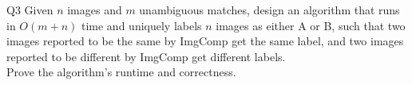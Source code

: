 \begin{problem}
  {Q3}
  Given $n$ images and $m$ unambiguous matches, design an algorithm that runs in $O(m+n)$ time and
  uniquely labels $n$ images as either A or B, such that two images reported to be the same by
  ImgComp get the same label, and two images reported to be different by ImgComp get different labels. \\
  Prove the algorithm's runtime and correctness. \\
\end{problem}
